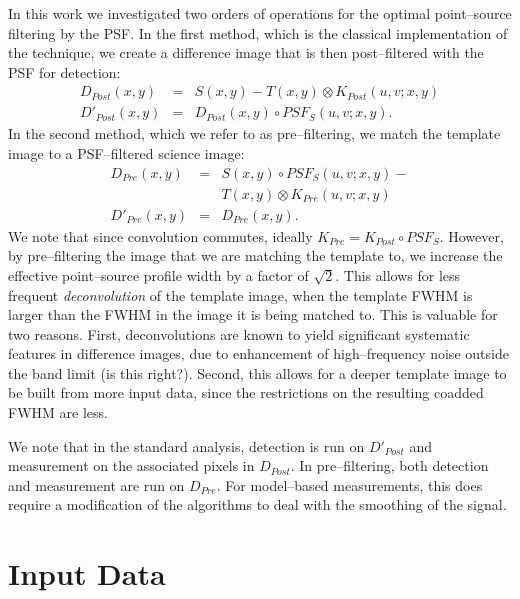 \documentclass[floatfix, apj]{emulateapj}
\begin{document}
In this work we investigated two orders of operations for the optimal point--source filtering by the PSF.
In the first method, which is the classical implementation of the technique, we create a difference image that is then post--filtered with the PSF for detection:
\begin{eqnarray}
D_{Post}(x,y) & = & S(x,y) - T(x,y) \otimes K_{Post}(u,v;x,y)  \nonumber \\
D'_{Post}(x,y) & = & D_{Post}(x,y) \circ PSF_S(u,v;x,y).  \nonumber
\end{eqnarray}
In the second method, which we refer to as pre--filtering, we match the template image to a PSF--filtered science image:
\begin{eqnarray}
D_{Pre}(x,y)  & = & S(x,y) \circ PSF_S(u,v;x,y) - \nonumber \\
             &   & T(x,y) \otimes K_{Pre}(u,v;x,y) \nonumber \\
D'_{Pre}(x,y) & = & D_{Pre}(x,y). \nonumber
\end{eqnarray}
We note that since convolution commutes, ideally $K_{Pre} = K_{Post} \circ PSF_S$.
However, by pre--filtering the image that we are matching the template to, we increase the effective point--source profile width by a factor of $\sqrt{2}$.
This allows for less frequent {\it deconvolution} of the template image, when the template FWHM is larger than the FWHM in the image it is being matched to.
This is valuable for two reasons.
First, deconvolutions are known to yield significant systematic features in difference images, due to enhancement of high--frequency noise outside the band limit (is this right?).
Second, this allows for a deeper template image to be built from more input data, since the restrictions on the resulting coadded FWHM are less.

We note that in the standard analysis, detection is run on $D'_{Post}$ and measurement on the associated pixels in $D_{Post}$.
In pre--filtering, both detection and measurement are run on $D_{Pre}$.
For model--based measurements, this does require a modification of the algorithms to deal with the smoothing of the signal.

\section{Input Data}
\end{document}
